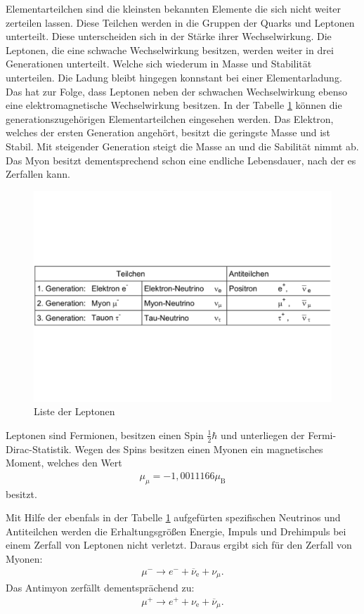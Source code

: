 Elementarteilchen sind die kleinsten bekannten Elemente die sich nicht weiter zerteilen lassen.
Diese Teilchen werden in die Gruppen der Quarks und Leptonen unterteilt.
Diese unterscheiden sich in der Stärke ihrer Wechselwirkung.
Die Leptonen, die eine schwache Wechselwirkung besitzen, werden weiter in drei Generationen unterteilt.
Welche sich wiederum in Masse und Stabilität unterteilen.
Die Ladung bleibt hingegen konnstant bei einer Elementarladung.
Das hat zur Folge, dass Leptonen neben der schwachen Wechselwirkung ebenso eine elektromagnetische Wechselwirkung besitzen.
In der Tabelle \ref{fig:gen} können die generationszugehörigen Elementarteilchen eingesehen werden.
Das Elektron, welches der ersten Generation angehört, besitzt die geringste Masse und ist Stabil.
Mit steigender Generation steigt die Masse an und die Sabilität nimmt ab.
Das Myon besitzt dementsprechend schon eine endliche Lebensdauer, nach der es Zerfallen kann.

\begin{figure}[h!]
  \centering
  \includegraphics[width=\textwidth]{tableptonen.pdf}
  \caption{Liste der Leptonen}
  \label{fig:gen}
\end{figure}
\FloatBarrier

Leptonen sind Fermionen, besitzen einen Spin $\frac{1}{2}\hbar$ und unterliegen der Fermi-Dirac-Statistik.
Wegen des Spins besitzen einen Myonen ein magnetisches Moment, welches den Wert
\begin{align*}
  \mu_{\mu} = -1,0011166\mu_{\text{B}}
\end{align*}
besitzt.

Mit Hilfe der ebenfals in der Tabelle \ref{fig:gen} aufgefürten spezifischen Neutrinos und Antiteilchen
werden die Erhaltungsgrößen Energie, Impuls und Drehimpuls bei einem Zerfall von Leptonen nicht verletzt.
Daraus ergibt sich für den Zerfall von Myonen:
\begin{align}
  \mu^{-}\rightarrow e^-+\overline{\nu}_\text{e}+\nu_{\mu}.
  \label{eqn:mu-}
\end{align}
Das Antimyon zerfällt dementsprächend zu:
\begin{align}
  \mu^{+}\rightarrow e^++\nu_\text{e}+\overline{\nu}_{\mu}.
  \label{eqn:mu+}
\end{align}

